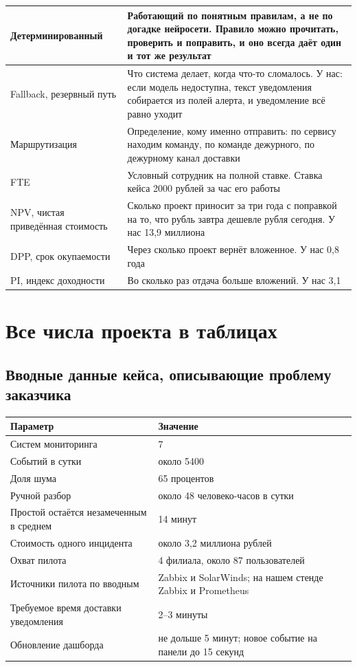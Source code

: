 \documentclass[11pt]{article}
\begin{document}
\begin{longtable}{|L{3.6cm}|L{12.9cm}|}
Детерминированный & Работающий по понятным правилам, а не по догадке нейросети. Правило можно прочитать, проверить и поправить, и оно всегда даёт один и тот же результат \\ \hline
Fallback, резервный путь & Что система делает, когда что-то сломалось. У нас: если модель недоступна, текст уведомления собирается из полей алерта, и уведомление всё равно уходит \\ \hline
Маршрутизация & Определение, кому именно отправить: по сервису находим команду, по команде дежурного, по дежурному канал доставки \\ \hline
FTE & Условный сотрудник на полной ставке. Ставка кейса 2000 рублей за час его работы \\ \hline
NPV, чистая приведённая стоимость & Сколько проект приносит за три года с поправкой на то, что рубль завтра дешевле рубля сегодня. У нас 13,9 миллиона \\ \hline
DPP, срок окупаемости & Через сколько проект вернёт вложенное. У нас 0,8 года \\ \hline
PI, индекс доходности & Во сколько раз отдача больше вложений. У нас 3,1 \\ \hline
\end{longtable}

\section{Все числа проекта в таблицах}

\subsection{Вводные данные кейса, описывающие проблему заказчика}
\begin{longtable}{|L{9cm}|L{7.5cm}|}
\hline
\textbf{Параметр} & \textbf{Значение} \\ \hline
Систем мониторинга & 7 \\ \hline
Событий в сутки & около 5400 \\ \hline
Доля шума & 65 процентов \\ \hline
Ручной разбор & около 48 человеко-часов в сутки \\ \hline
Простой остаётся незамеченным в среднем & 14 минут \\ \hline
Стоимость одного инцидента & около 3,2 миллиона рублей \\ \hline
Охват пилота & 4 филиала, около 87 пользователей \\ \hline
Источники пилота по вводным & Zabbix и SolarWinds; на нашем стенде Zabbix и Prometheus \\ \hline
Требуемое время доставки уведомления & 2--3 минуты \\ \hline
Обновление дашборда & не дольше 5 минут; новое событие на панели до 15 секунд \\ \hline
\end{longtable}
\end{document}
